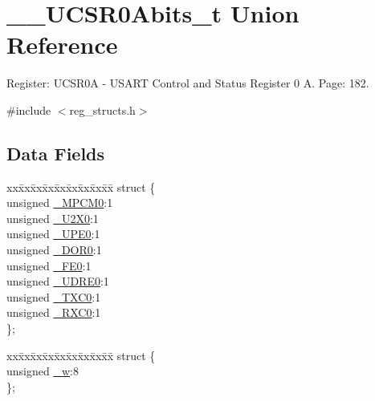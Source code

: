 \hypertarget{union_____u_c_s_r0_abits__t}{\section{\+\_\+\+\_\+\+U\+C\+S\+R0\+Abits\+\_\+t Union Reference}
\label{union_____u_c_s_r0_abits__t}
}


Register\+: U\+C\+S\+R0\+A -\/ U\+S\+A\+R\+T Control and Status Register 0 A. Page\+: 182.  




{\ttfamily \#include $<$reg\+\_\+structs.\+h$>$}

\subsection*{Data Fields}
\begin{DoxyCompactItemize}
\item 
\begin{tabbing}
xx\=xx\=xx\=xx\=xx\=xx\=xx\=xx\=xx\=\kill
struct \{\\
\>unsigned \hyperlink{union_____u_c_s_r0_abits__t_a257c2408b53c4c822a3603e786e2d281}{\_MPCM0}:1\\
\>unsigned \hyperlink{union_____u_c_s_r0_abits__t_a07bfe70996fd415a70a81e631d8faf44}{\_U2X0}:1\\
\>unsigned \hyperlink{union_____u_c_s_r0_abits__t_a24651b56b5e2b20fae50767b04882a18}{\_UPE0}:1\\
\>unsigned \hyperlink{union_____u_c_s_r0_abits__t_a5d58b9f6c1df9ac79c5b7a9f025d5e37}{\_DOR0}:1\\
\>unsigned \hyperlink{union_____u_c_s_r0_abits__t_af150a0a9ac1abaa2a8df78edfe0cba75}{\_FE0}:1\\
\>unsigned \hyperlink{union_____u_c_s_r0_abits__t_a551657542abf11f95acd0b35fd94bb6d}{\_UDRE0}:1\\
\>unsigned \hyperlink{union_____u_c_s_r0_abits__t_a2d8c629a0fe3d3cc7863a06368d3cc2a}{\_TXC0}:1\\
\>unsigned \hyperlink{union_____u_c_s_r0_abits__t_ae187d165cbd0e5b41cf703c1cf41e0e1}{\_RXC0}:1\\
\}; \\

\end{tabbing}\item 
\begin{tabbing}
xx\=xx\=xx\=xx\=xx\=xx\=xx\=xx\=xx\=\kill
struct \{\\
\>unsigned \hyperlink{union_____u_c_s_r0_abits__t_ad6ad067a07dd1c95e32bd2c78b1737d7}{\_w}:8\\
\}; \\

\end{tabbing}\end{DoxyCompactItemize}


